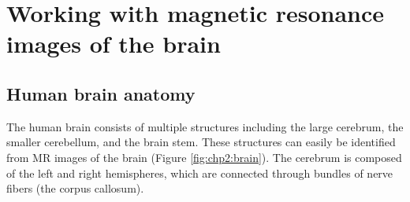 \chapter{Working with magnetic resonance images of the brain}
\label{chp:chp2}

\section{Human brain anatomy}
\label{sec:chp2:anatomy}

The human brain consists of multiple structures including the large
cerebrum, the smaller cerebellum, and the brain stem. These structures
can easily be identified from MR images of the
brain (Figure \ref{fig:chp2:brain}). The cerebrum is composed of the
left and right hemispheres, which are connected through bundles of
nerve fibers (the corpus callosum).


